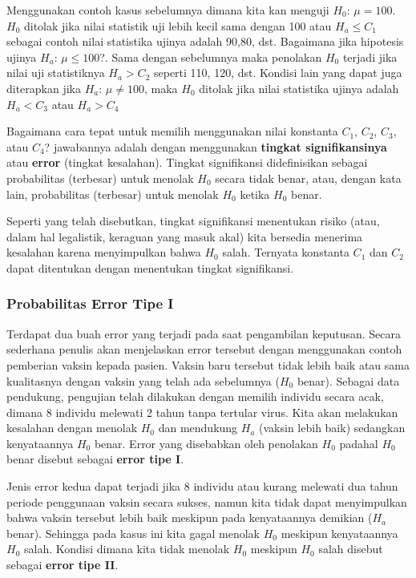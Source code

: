\documentclass[]{book}
\begin{document}
Menggunakan contoh kasus sebelumnya dimana kita kan menguji
\textbf{\(H_0\)}: \(\mu=100\). \(H_0\) ditolak jika nilai statistik uji
lebih kecil sama dengan 100 atau \(H_a\le C_1\) sebagai contoh nilai
statistika ujinya adalah 90,80, dst. Bagaimana jika hipotesis ujinya
\textbf{\(H_a\)}: \(\mu \le 100\)?. Sama dengan sebelumnya maka
penolakan \(H_0\) terjadi jika nilai uji statistiknya \(H_a>C_2\)
seperti 110, 120, dst. Kondisi lain yang dapat juga diterapkan jika
\textbf{\(H_a\)}: \(\mu \neq 100\), maka \(H_0\) ditolak jika nilai
statistika ujinya adalah \(H_a<C_3\) atau \(H_a>C_4\)

Bagaimana cara tepat untuk memilih menggunakan nilai konstanta \(C_1\),
\(C_2\), \(C_3\), atau \(C_4\)? jawabannya adalah dengan menggunakan
\textbf{tingkat signifikansinya} atau \textbf{error} (tingkat
kesalahan). Tingkat signifikansi didefinisikan sebagai probabilitas
(terbesar) untuk menolak \(H_0\) secara tidak benar, atau, dengan kata
lain, probabilitas (terbesar) untuk menolak \(H_0\) ketika \(H_0\)
benar.

Seperti yang telah disebutkan, tingkat signifikansi menentukan risiko
(atau, dalam hal legalistik, keraguan yang masuk akal) kita bersedia
menerima kesalahan karena menyimpulkan bahwa \(H_0\) salah. Ternyata
konstanta \(C_1\) dan \(C_2\) dapat ditentukan dengan menentukan tingkat
signifikansi.

\subsubsection{Probabilitas Error Tipe
I}\label{probabilitas-error-tipe-i}

Terdapat dua buah error yang terjadi pada saat pengambilan keputusan.
Secara sederhana penulis akan menjelaskan error tersebut dengan
menggunakan contoh pemberian vaksin kepada pasien. Vaksin baru tersebut
tidak lebih baik atau sama kualitasnya dengan vaksin yang telah ada
sebelumnya (\(H_0\) benar). Sebagai data pendukung, pengujian telah
dilakukan dengan memilih individu secara acak, dimana 8 individu
melewati 2 tahun tanpa tertular virus. Kita akan melakukan kesalahan
dengan menolak \(H_0\) dan mendukung \(H_a\) (vaksin lebih baik)
sedangkan kenyataannya \(H_0\) benar. Error yang disebabkan oleh
penolakan \(H_0\) padahal \(H_0\) benar disebut sebagai \textbf{error
tipe I}.

Jenis error kedua dapat terjadi jika 8 individu atau kurang melewati dua
tahun periode penggunaan vaksin secara sukses, namun kita tidak dapat
menyimpulkan bahwa vaksin tersebut lebih baik meskipun pada kenyataannya
demikian (\(H_a\) benar). Sehingga pada kasus ini kita gagal menolak
\(H_0\) meskipun kenyataannya \(H_0\) salah. Kondisi dimana kita tidak
menolak \(H_0\) meskipun \(H_0\) salah disebut sebagai \textbf{error
tipe II}.
\end{document}
